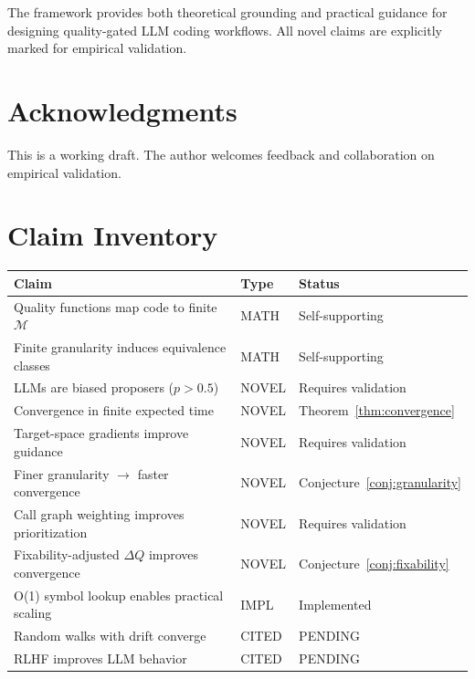\documentclass[11pt,a4paper]{article}
\begin{document}
The framework provides both theoretical grounding and practical guidance for designing quality-gated LLM coding workflows. All novel claims are explicitly marked for empirical validation.

\section*{Acknowledgments}

This is a working draft. The author welcomes feedback and collaboration on empirical validation.

\appendix
\section{Claim Inventory}
\label{app:claims}

\begin{center}
\begin{tabular}{lll}
\toprule
\textbf{Claim} & \textbf{Type} & \textbf{Status} \\
\midrule
Quality functions map code to finite $\mathcal{M}$ & MATH & Self-supporting \\
Finite granularity induces equivalence classes & MATH & Self-supporting \\
LLMs are biased proposers ($p > 0.5$) & NOVEL & Requires validation \\
Convergence in finite expected time & NOVEL & Theorem~\ref{thm:convergence} \\
Target-space gradients improve guidance & NOVEL & Requires validation \\
Finer granularity $\to$ faster convergence & NOVEL & Conjecture~\ref{conj:granularity} \\
Call graph weighting improves prioritization & NOVEL & Requires validation \\
Fixability-adjusted $\Delta Q$ improves convergence & NOVEL & Conjecture~\ref{conj:fixability} \\
O(1) symbol lookup enables practical scaling & IMPL & Implemented \\
Random walks with drift converge & CITED & PENDING \\
RLHF improves LLM behavior & CITED & PENDING \\
\bottomrule
\end{tabular}
\end{center}
\end{document}
